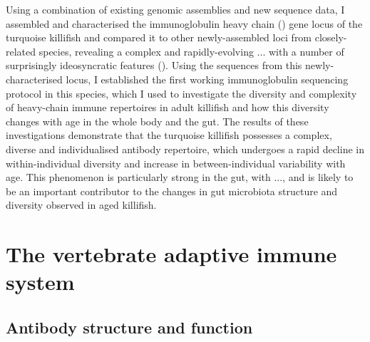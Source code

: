 Using a combination of existing genomic assemblies and new sequence data, I assembled and characterised the immunoglobulin heavy chain (\igh{}) gene locus of the turquoise killifish and compared it to other newly-assembled loci from closely-related species, revealing a complex and rapidly-evolving ... with a number of surprisingly ideosyncratic features (). Using the sequences from this newly-characterised locus, I established the first working immunoglobulin sequencing protocol in this species, which I used to investigate the diversity and complexity of heavy-chain immune repertoires in adult killifish and how this diversity changes with age in the whole body and the gut. The results of these investigations demonstrate that the turquoise killifish possesses a complex, diverse and individualised antibody repertoire, which undergoes a rapid decline in within-individual diversity and increase in between-individual variability with age. This phenomenon is particularly strong in the gut, with ..., and is likely to be an important contributor to the changes in gut microbiota structure and diversity observed in aged killifish. %



\section{The vertebrate adaptive immune system} %

\subsection{Antibody structure and function}

